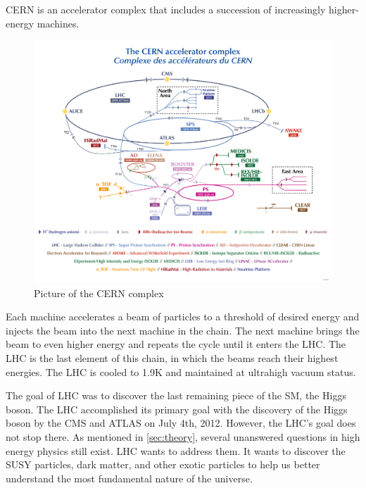 CERN is an accelerator complex that includes a succession of increasingly higher-energy machines.
\begin{figure}[h!]
	\caption{Picture of the CERN complex \cite{CERN}}
  \label{fig:CERN}
  \centering
  \includegraphics[width=1.0\linewidth]{figs/LHC.png}
\end{figure}
Each machine accelerates a beam of particles to a threshold of desired energy and injects the beam into the next machine in the chain.
The next machine brings the beam to even higher energy and repeats the cycle until it enters the LHC.
The LHC is the last element of this chain, in which the beams reach their highest energies.
The LHC is cooled to 1.9K and maintained at ultrahigh vacuum status.

The goal of LHC was to discover the last remaining piece of the SM, the Higgs boson.
The LHC accomplished its primary goal with the discovery of the Higgs boson by the CMS and ATLAS on July 4th, 2012.
However, the LHC's goal does not stop there.
As mentioned in \ref{sec:theory}, several unanswered questions in high energy physics still exist.
LHC wants to address them. It wants to discover the SUSY particles, dark matter, and other exotic particles to help us better understand the most fundamental nature of the universe.

